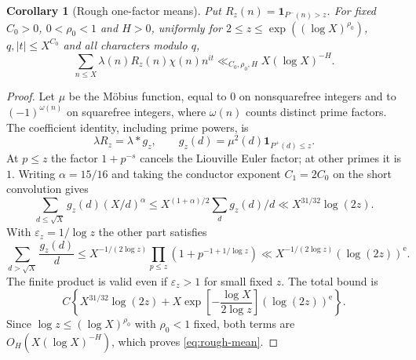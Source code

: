 \documentclass[11pt]{article}
\newtheorem{corollary}[theorem]{Corollary}
\theoremstyle{definition}
\newcommand{\ind}{\mathbf 1}
\newcommand{\Rz}{R_z}
\theoremstyle{remark}
\begin{document}
\begin{corollary}[Rough one-factor means]\label{cor:rough-mean}
Put $\Rz(n)=\ind_{P^-(n)>z}$. For fixed $C_0>0$,
$0<\rho_0<1$ and $H>0$, uniformly for
$2\le z\le\exp((\log X)^{\rho_0})$, $q,|t|\le X^{C_0}$ and all
characters modulo $q$,
\begin{equation}\label{eq:rough-mean}
\sum_{n\le X}\lambda(n)\Rz(n)\chi(n)n^{it}
\ll_{C_0,\rho_0,H}X(\log X)^{-H}.
\end{equation}
\end{corollary}
\begin{proof}
Let $\mu$ be the M\"obius function, equal to $0$ on nonsquarefree
integers and to $(-1)^{\omega(n)}$ on squarefree integers, where
$\omega(n)$ counts distinct prime factors.
The coefficient identity, including prime powers, is
\begin{equation}\label{eq:rough-convolution}
\lambda\Rz=\lambda*g_z,\qquad
g_z(d)=\mu^2(d)\ind_{P^+(d)\le z}.
\end{equation}
At $p\le z$ the factor $1+p^{-s}$ cancels the Liouville Euler
factor; at other primes it is $1$.
Writing $\alpha=15/16$ and taking the conductor exponent
$C_1=2C_0$ on the short convolution gives
\begin{equation}\label{eq:rough-small-part}
\sum_{d\le\sqrt X}g_z(d)(X/d)^\alpha
\le X^{(1+\alpha)/2}\sum_dg_z(d)/d
\ll X^{31/32}\log(2z).
\end{equation}
With $\varepsilon_z=1/\log z$ the other part satisfies
\begin{equation}\label{eq:rough-tail}
\sum_{d>\sqrt X}\frac{g_z(d)}d
\le X^{-1/(2\log z)}
 \prod_{p\le z}(1+p^{-1+1/\log z})
\ll X^{-1/(2\log z)}(\log(2z))^{\mathrm e}.
\end{equation}
The finite product is valid even if $\varepsilon_z>1$ for small
fixed $z$. The total bound is
\begin{equation}\label{eq:rough-total}
C\left\{X^{31/32}\log(2z)
+X\exp\left[-\frac{\log X}{2\log z}\right]
 (\log(2z))^{\mathrm e}\right\}.
\end{equation}
Since $\log z\le(\log X)^{\rho_0}$ with $\rho_0<1$ fixed, both terms are $O_H(X(\log X)^{-H})$, which proves \eqref{eq:rough-mean}.
\end{proof}
\end{document}
